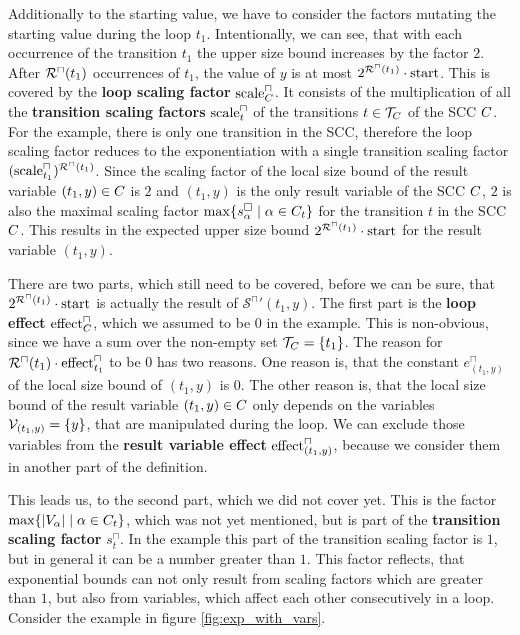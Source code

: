 Additionally to the starting value, we have to consider the factors mutating the starting value during the loop $t_1$.
Intentionally, we can see, that with each occurrence of the transition $t_1$ the upper size bound increases by the factor $2$.
After ${\mathcal{R}^\sqcap}(t_1)$ occurrences of $t_1$, the value of $y$ is at most $2^{{\mathcal{R}^\sqcap}(t_1)} \cdot \text{start}$.
This is covered by the \textbf{loop scaling factor} $\text{scale}^\sqcap_C$.
It consists of the multiplication of all the \textbf{transition scaling factors} $\text{scale}^\sqcap_t$ of the transitions $t \in \mathcal{T}_C$ of the SCC $C$.
For the example, there is only one transition in the SCC, therefore the loop scaling factor reduces to the exponentiation with a single transition scaling factor $(\text{scale}^\sqcap_{t_1})^{{\mathcal{R}^\sqcap}(t_1)}$.
Since the scaling factor of the local size bound of the result variable $(t_1,y) \in C$ is $2$ and $(t_1,y)$ is the only result variable of the SCC $C$, $2$ is also the maximal scaling factor $\max \lbrace s^\square_{\alpha} \mid \alpha \in C_t \rbrace$ for the transition $t$ in the SCC $C$.
This results in the expected upper size bound $2^{{\mathcal{R}^\sqcap}(t_1)} \cdot \text{start}$ for the result variable $(t_1,y)$.

There are two parts, which still need to be covered, before we can be sure, that $2^{{\mathcal{R}^\sqcap}(t_1)} \cdot \text{start}$ is actually the result of ${\mathcal{S}^\sqcap}'(t_1,y)$.
The first part is the \textbf{loop effect} $\text{effect}^\sqcap_C$, which we assumed to be $0$ in the example.
This is non-obvious, since we have a sum over the non-empty set $\mathcal{T}_C = \lbrace t_1 \rbrace$.
The reason for ${\mathcal{R}^\sqcap}(t_1) \cdot \text{effect}^\sqcap_{t_1}$ to be $0$ has two reasons.
One reason is, that the constant $e^\sqcap_{(t_1,y)}$ of the local size bound of $(t_1,y)$ is $0$.
The other reason is, that the local size bound of the result variable $(t_1,y) \in C$ only depends on the variables $\mathcal{V}_{(t_1,y)} = \lbrace y \rbrace$, that are manipulated during the loop.
We can exclude those variables from the \textbf{result variable effect} $\text{effect}^\sqcap_{(t_1,y)}$, because we consider them in another part of the definition.

This leads us, to the second part, which we did not cover yet.
This is the factor $\max \lbrace \left|V_\alpha\right| \mid \alpha \in C_t \rbrace$, which was not yet mentioned, but is part of the \textbf{transition scaling factor} $s^\sqcap_t$.
In the example this part of the transition scaling factor is $1$, but in general it can be a number greater than $1$.
This factor reflects, that exponential bounds can not only result from scaling factors which are greater than $1$, but also from variables, which affect each other consecutively in a loop.
Consider the example in figure \ref{fig:exp_with_vars}.

